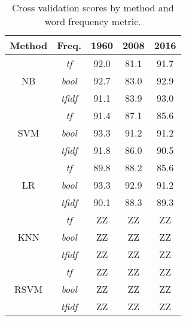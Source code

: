\documentclass[aps, prl, reprint, showpacs]{revtex4-1}
\begin{document}
\begin{table} %
  \begin{ruledtabular}
  \begin{tabular}{ccccc}
  Method & Freq.& 1960 & 2008 & 2016 \\
    \hline
 & \textit{tf} & 92.0  & 81.1 & 91.7 \\
NB & \textit{bool} & 92.7  & 83.0 & 92.9 \\
 & \textit{tfidf} & 91.1  & 83.9 & 93.0 \\
 \hline
 & \textit{tf} & 91.4 & 87.1 & 85.6 \\
SVM & \textit{bool} & 93.3 & 91.2 & 91.2 \\
 & \textit{tfidf} & 91.8 & 86.0 & 90.5 \\
 \hline
   & \textit{tf} & 89.8  & 88.2 & 85.6 \\
LR & \textit{bool} & 93.3  & 92.9 & 91.2 \\
 & \textit{tfidf} & 90.1  & 88.3 & 89.3 \\
 \hline
   & \textit{tf} & ZZ  & ZZ & ZZ \\
KNN & \textit{bool} & ZZ  & ZZ & ZZ \\
 & \textit{tfidf} & ZZ  & ZZ & ZZ \\
 \hline
  & \textit{tf} & ZZ  & ZZ & ZZ \\
RSVM & \textit{bool} & ZZ  & ZZ & ZZ \\
 & \textit{tfidf} & ZZ  & ZZ & ZZ \\
 \hline
  \end{tabular}
  \end{ruledtabular}
    \caption{Cross validation scores by method and word frequency metric.}
     \label{tab:crossval}
\end{table}
\end{document}
